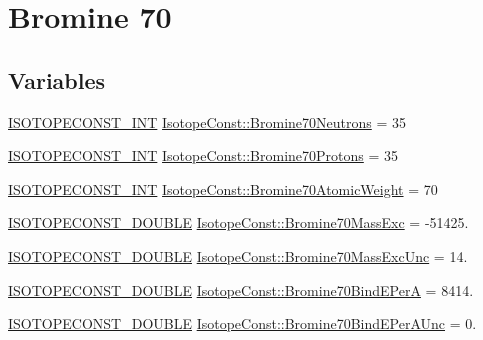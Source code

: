 \hypertarget{group___isotope_const-_bromine-_br70}{}\section{Bromine 70}
\label{group___isotope_const-_bromine-_br70}
\subsection*{Variables}
\begin{DoxyCompactItemize}
\item 
\mbox{\hyperlink{group___isotope_const-_macros_ga5f18360b3e99483a35c32d789e62621c}{I\+S\+O\+T\+O\+P\+E\+C\+O\+N\+S\+T\+\_\+\+I\+NT}} \mbox{\hyperlink{group___isotope_const-_bromine-_br70_gab2cf62eee85bd1b6fb8db0169a05d1ac}{Isotope\+Const\+::\+Bromine70\+Neutrons}} = 35
\item 
\mbox{\hyperlink{group___isotope_const-_macros_ga5f18360b3e99483a35c32d789e62621c}{I\+S\+O\+T\+O\+P\+E\+C\+O\+N\+S\+T\+\_\+\+I\+NT}} \mbox{\hyperlink{group___isotope_const-_bromine-_br70_ga25d599124974e9d20c0db88dea222dd6}{Isotope\+Const\+::\+Bromine70\+Protons}} = 35
\item 
\mbox{\hyperlink{group___isotope_const-_macros_ga5f18360b3e99483a35c32d789e62621c}{I\+S\+O\+T\+O\+P\+E\+C\+O\+N\+S\+T\+\_\+\+I\+NT}} \mbox{\hyperlink{group___isotope_const-_bromine-_br70_ga7647ea2b1214fe431b094ad1edc6882c}{Isotope\+Const\+::\+Bromine70\+Atomic\+Weight}} = 70
\item 
\mbox{\hyperlink{group___isotope_const-_macros_ga8f45a7272ce02c0b4c65c44636ed719a}{I\+S\+O\+T\+O\+P\+E\+C\+O\+N\+S\+T\+\_\+\+D\+O\+U\+B\+LE}} \mbox{\hyperlink{group___isotope_const-_bromine-_br70_ga1c4c7eded9c2084bed5a6024b970956e}{Isotope\+Const\+::\+Bromine70\+Mass\+Exc}} = -\/51425.
\item 
\mbox{\hyperlink{group___isotope_const-_macros_ga8f45a7272ce02c0b4c65c44636ed719a}{I\+S\+O\+T\+O\+P\+E\+C\+O\+N\+S\+T\+\_\+\+D\+O\+U\+B\+LE}} \mbox{\hyperlink{group___isotope_const-_bromine-_br70_ga7a0c5236bed5d97bda08596f38baea44}{Isotope\+Const\+::\+Bromine70\+Mass\+Exc\+Unc}} = 14.
\item 
\mbox{\hyperlink{group___isotope_const-_macros_ga8f45a7272ce02c0b4c65c44636ed719a}{I\+S\+O\+T\+O\+P\+E\+C\+O\+N\+S\+T\+\_\+\+D\+O\+U\+B\+LE}} \mbox{\hyperlink{group___isotope_const-_bromine-_br70_ga757abc790a646a604c720f5616333826}{Isotope\+Const\+::\+Bromine70\+Bind\+E\+PerA}} = 8414.
\item 
\mbox{\hyperlink{group___isotope_const-_macros_ga8f45a7272ce02c0b4c65c44636ed719a}{I\+S\+O\+T\+O\+P\+E\+C\+O\+N\+S\+T\+\_\+\+D\+O\+U\+B\+LE}} \mbox{\hyperlink{group___isotope_const-_bromine-_br70_gaa813718574a1af64b6f8ad074b527173}{Isotope\+Const\+::\+Bromine70\+Bind\+E\+Per\+A\+Unc}} = 0.

\end{DoxyCompactItemize}
